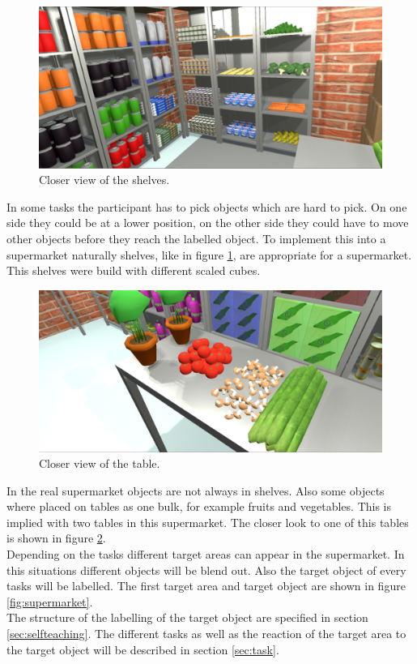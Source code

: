 \begin{figure}[H] 
	\center 
	\includegraphics[width=12cm]{Images/supermarket2.PNG}
	\caption[Closer view of the shelves.]{Closer view of the shelves.}
	\label{fig:shelve}
\end{figure}

In some tasks the participant has to pick objects which are hard to pick. On one side they could be at a lower position, on the other side they could have to move other objects before they reach the labelled object. To implement this into a supermarket naturally shelves, like in figure \ref{fig:shelve}, are appropriate for a supermarket. This shelves were build with different scaled cubes.

\begin{figure}[H] 
	\center 
	\includegraphics[width=12cm]{Images/supermarket1.PNG}
	\caption[Closer view of the table.]{Closer view of the table.}
	\label{fig:table}
\end{figure}	

In the real supermarket objects are not always in shelves. Also some objects where placed on tables as one bulk, for example fruits and vegetables. This is implied with two tables in this supermarket. The closer look to one of this tables is shown in figure \ref{fig:table}.\\
Depending on the tasks different target areas can appear in the supermarket. In this situations different objects will be blend out. Also the target object of every tasks will be labelled. The first target area and target object are shown in figure \ref{fig:supermarket}.\\
 The structure of the labelling of the target object are specified in section \ref{sec:selfteaching}.
The different tasks as well as the reaction of the target area to the target object will be described in section \ref{sec:task}. %

